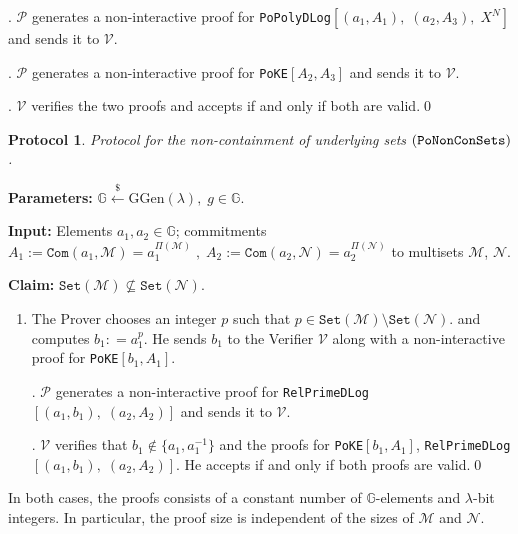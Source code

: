 \documentclass[11pt, lettersize, notitlepage, leqno, footskip=0.6cm]{article}
\newcommand{\ttt}{\texttt}
\newcommand{\sett}{\ttt{Set}}
\newcommand{\mc}{\mathcal}
\newcommand{\mb}{\mathbb}
\newcommand{\mr}{\mathrm}
\newcommand{\lam}{\lambda}
\newcommand{\lamb}{\lambda}
\newcommand{\nsub}{\nsubseteq}
\newcommand{\mP}{\mc{P}}
\newcommand{\V}{\mc{V}}
\newcommand{\mcM}{\mc{M}}
\newcommand{\vs}{\vspace{-0.15cm}}
\newcommand{\noin}{\noindent}
\newtheorem{Prot}[Thm]{Protocol}
\numberwithin{equation}{section}
\begin{document}
{{{\begin{enumerate}[wide, labelwidth=!, labelindent=0pt]
\noin 2. $\mP$ generates a non-interactive proof for \verb|PoPolyDLog|$[(a_1, A_1),\;(a_2, A_3),\;X^N]$ and sends it to $\V$.

\noin 3. $\mP$ generates a non-interactive proof for \verb|PoKE|$[A_2,A_3]$ and sends it to $\V$.

\noin 4. $\V$ verifies the two proofs and accepts if and only if both are valid.\qed \end{enumerate}



\begin{Prot} Protocol for the non-containment of underlying sets $(\tt{PoNonConSets})$.\end{Prot}\vspace{-0.3cm}

\noin \textbf{Parameters:} $\mb{G}\xleftarrow{\$} \mr{GGen}(\lamb), \; g\in \mb{G}$. 

\noin \textbf{Input:} Elements $a_1,a_2\in\mb{G}$; commitments $A_1 := \ttt{Com}(a_1, \mc{M}) = a_1^{\Pi(\mc{M})}\;,\;A_2 := \ttt{Com}(a_2, \mc{N})= a_2^{\Pi(\mc{N})}$ to multisets $\mc{M}$, $\mc{N}$.

\noin \textbf{Claim:} $\sett(\mc{M})\nsub \sett(\mc{N})$. \vs

\begin{enumerate}[wide, labelwidth=!, labelindent=0pt] \vs \item The Prover chooses an integer $p$ such that $p\in \sett(\mc{M})\setminus \sett(\mc{N}).$ and computes $b_1: = a_1^p$. He sends $b_1$ to the Verifier $\V$ along with a non-interactive proof for \verb|PoKE|$[b_1, A_1]$.

\noin 2. $\mP$ generates a non-interactive proof for \verb|RelPrimeDLog|$[(a_1, b_1),\; (a_2, A_2)]$ and sends it to $\V$.

\noin 3. $\V$ verifies that $b_1\notin \{ a_1, a_1^{-1}\}$ and the proofs for \verb|PoKE|$[b_1, A_1]$, \verb|RelPrimeDLog|$[(a_1, b_1),\; (a_2, A_2)]$. He accepts if and only if both proofs are valid.\qed \end{enumerate}

\noin In both cases, the proofs consists of a constant number of $\mb{G}$-elements and $\lam$-bit integers. In particular, the proof size is independent of the sizes of $\mcM$ and $\mc{N}$.








\begin{comment}


\end{comment}}}}
\end{document}
